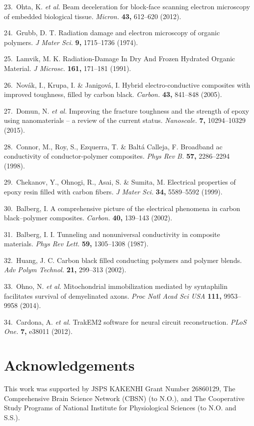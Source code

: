 \documentclass{article}
\newenvironment{reflist}{\par\small\setlength{\parindent}{0pt}\everypar{\hangindent=2.2em\hangafter=1}}{\par}
\begin{document}
\begin{reflist}
23.~Ohta, K. \emph{et al.} Beam deceleration for block-face scanning electron microscopy of embedded biological tissue. \emph{Micron.} \textbf{43,} 612–620 (2012).

24.~Grubb, D. T. Radiation damage and electron microscopy of organic polymers. \emph{J Mater Sci.} \textbf{9,} 1715–1736 (1974).

25.~Lamvik, M. K. Radiation-Damage In Dry And Frozen Hydrated Organic Material. \emph{J Microsc.} \textbf{161,} 171–181 (1991).

26.~Novák, I., Krupa, I. \& Janigová, I. Hybrid electro-conductive composites with improved toughness, filled by carbon black. \emph{Carbon.} \textbf{43,} 841–848 (2005).

27.~Domun, N. \emph{et al.} Improving the fracture toughness and the strength of epoxy using nanomaterials – a review of the current status. \emph{Nanoscale.} \textbf{7,} 10294–10329 (2015).

28.~Connor, M., Roy, S., Ezquerra, T. \& Baltá Calleja, F. Broadband ac conductivity of conductor-polymer composites. \emph{Phys Rev B.} \textbf{57,} 2286–2294 (1998).

29.~Chekanov, Y., Ohnogi, R., Asai, S. \& Sumita, M. Electrical properties of epoxy resin filled with carbon fibers. \emph{J Mater Sci.} \textbf{34,} 5589–5592 (1999).

30.~Balberg, I. A comprehensive picture of the electrical phenomena in carbon black–polymer composites. \emph{Carbon.} \textbf{40,} 139–143 (2002).

31.~Balberg, I. I. Tunneling and nonuniversal conductivity in composite materials. \emph{Phys Rev Lett.} \textbf{59,} 1305–1308 (1987).

32.~Huang, J. C. Carbon black filled conducting polymers and polymer blends. \emph{Adv Polym Technol.} \textbf{21,} 299–313 (2002).

33.~Ohno, N. \emph{et al.} Mitochondrial immobilization mediated by syntaphilin facilitates survival of demyelinated axons. \emph{Proc Natl Acad Sci USA} \textbf{111,} 9953–9958 (2014).

34.~Cardona, A. \emph{et al.} TrakEM2 software for neural circuit reconstruction. \emph{PLoS One.} \textbf{7,} e38011 (2012).
\end{reflist}

\section*{Acknowledgements}
This work was supported by JSPS KAKENHI Grant Number 26860129, The Comprehensive Brain Science Network (CBSN) (to N.O.), and The Cooperative Study Programs of National Institute for Physiological Sciences (to N.O. and S.S.).
\end{document}
